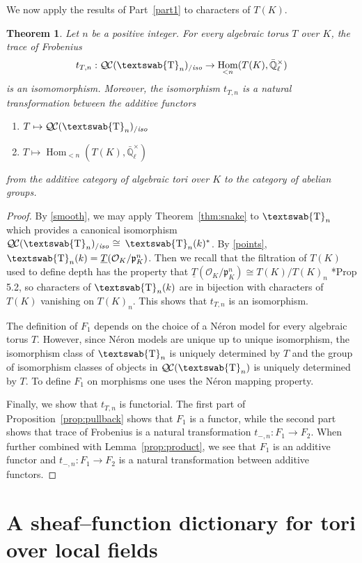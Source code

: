 \documentclass[11pt]{amsart}
\newcommand{\mathswab}[1]{\operatorname{\textswab{#1}}}
\theoremstyle{plain}
\newtheorem{theorem}{Theorem}[section]
\theoremstyle{definition}
\theoremstyle{remark}
\newcommand{\EE}{\mathbb{\bar Q}_\ell}
\newcommand{\OK}{\mathcal{O}_K}
\newcommand{\pK}{\mathfrak{p}_K}
\newcommand{\Fq}{k}
\newcommand{\EEx}{\EE^\times}
\DeclareMathOperator{\Hom}{Hom}
\newcommand{\iso}{{\ \cong\ }}
\newcommand{\GN}[1]{\mathswab{#1}}
\newcommand{\TT}{\underline{T}}
\newcommand{\QC}{{\mathcal{Q\hskip-0.8pt C}}}
\newcommand{\QCiso}[1]{\QC(#1)_{/\textit{iso}}}
\newcommand{\trFrob}[1]{t_{#1}}
\begin{document}
We now apply the results of Part~\ref{part1} to characters of $T(K)$.

\begin{theorem}\label{thm:application}
Let $n$ be a positive integer.
For every algebraic torus $T$ over $K$, the trace of Frobenius 
  \[
\trFrob{T,n}:  \QCiso{\GN{T}_n} \to \Hom_{< n}(T(K),\EEx)
  \]
is an isomomorphism. 
Moreover, the isomorphism $\trFrob{T,n}$ is a natural transformation
between the additive functors
\begin{enumerate}
\item[$F_1$:] $T \mapsto \QCiso{\GN{T}_n}$
\item[$F_2$:] $T \mapsto \Hom_{<n}(T(K),\EEx)$
\end{enumerate}
from the additive category of algebraic tori over $K$ to the category of abelian groups.
\end{theorem}

\begin{proof}
  By \ref{smooth}, we may apply Theorem~\ref{thm:snake} to
  $\GN{T}_n$ which provides a canonical isomorphism
  $\QCiso{\GN{T}_n} \iso \GN{T}_n(\Fq)^*$.
  By \ref{points}, $\GN{T}_n(\Fq) = \TT(\OK/\pK^n)$.
  Then we recall that the filtration of $T(K)$ used to
  define depth has the property that $\TT(\OK/\pK^n) \cong T(K) / T(K)_n$
  \cite{yu:03a}*{Prop 5.2}, so characters of $\GN{T}_n(\Fq)$ 
  are in bijection with characters of $T(K)$ vanishing on $T(K)_n$. 
  This shows that $\trFrob{T,n}$ is an isomorphism.

  The definition of $F_1$ depends 
  on the choice of a Néron model for every algebraic torus $T$.
  However, since Néron models are unique up to unique isomorphism,
  the isomorphism class of $\GN{T}_n$ is uniquely determined by $T$
  and the group of isomorphism classes of objects in $\QC(\GN{T}_n)$ 
  is uniquely determined by $T$. 
  To define $F_1$ on morphisms one uses the Néron mapping property.
  
  Finally, we show that $\trFrob{T,n}$ is functorial.
The first part of Proposition~\ref{prop:pullback} shows that $F_1$ is a functor,
while the second part shows that trace of Frobenius is a natural transformation
$t_{ - ,n} : F_1 \to F_2$. When further combined with Lemma~\ref{prop:product},
we see that $F_1$ is an additive functor and $t_{ - ,n}: F_1 \to F_2$ is a
natural transformation between additive functors.
\end{proof}


\section{A sheaf--function dictionary for tori over local fields} \label{sec:quasichar} 
\end{document}
